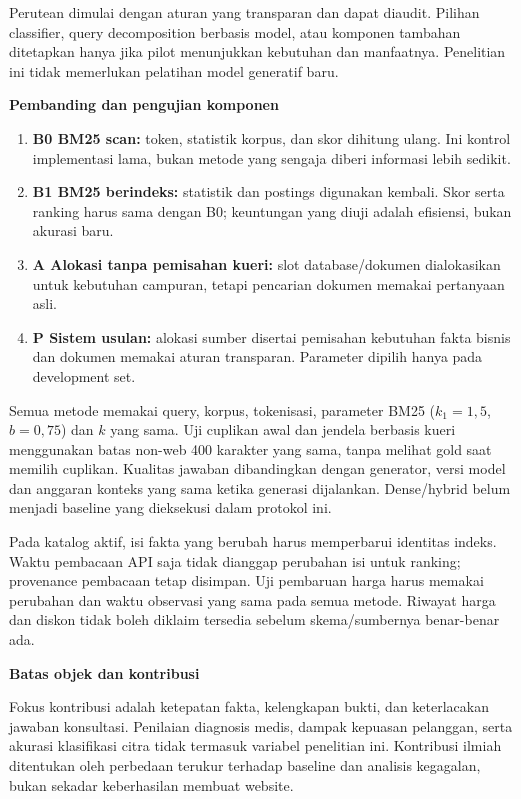 \documentclass[11pt,a4paper]{article}
\newcommand{\subheading}[1]{\vspace{3pt}\textbf{#1}\par}
\begin{document}
Perutean dimulai dengan aturan yang transparan dan dapat diaudit. Pilihan classifier, query decomposition berbasis model, atau komponen tambahan ditetapkan hanya jika pilot menunjukkan kebutuhan dan manfaatnya. Penelitian ini tidak memerlukan pelatihan model generatif baru.

\subheading{Pembanding dan pengujian komponen}
\begin{enumerate}
\item \textbf{B0 BM25 scan:} token, statistik korpus, dan skor dihitung ulang. Ini kontrol implementasi lama, bukan metode yang sengaja diberi informasi lebih sedikit.
\item \textbf{B1 BM25 berindeks:} statistik dan postings digunakan kembali. Skor serta ranking harus sama dengan B0; keuntungan yang diuji adalah efisiensi, bukan akurasi baru.
\item \textbf{A Alokasi tanpa pemisahan kueri:} slot database/dokumen dialokasikan untuk kebutuhan campuran, tetapi pencarian dokumen memakai pertanyaan asli.
\item \textbf{P Sistem usulan:} alokasi sumber disertai pemisahan kebutuhan fakta bisnis dan dokumen memakai aturan transparan. Parameter dipilih hanya pada development set.
\end{enumerate}

Semua metode memakai query, korpus, tokenisasi, parameter BM25 ($k_1=1{,}5$, $b=0{,}75$) dan $k$ yang sama. Uji cuplikan awal dan jendela berbasis kueri menggunakan batas non-web 400 karakter yang sama, tanpa melihat gold saat memilih cuplikan. Kualitas jawaban dibandingkan dengan generator, versi model dan anggaran konteks yang sama ketika generasi dijalankan. Dense/hybrid belum menjadi baseline yang dieksekusi dalam protokol ini.

Pada katalog aktif, isi fakta yang berubah harus memperbarui identitas indeks. Waktu pembacaan API saja tidak dianggap perubahan isi untuk ranking; provenance pembacaan tetap disimpan. Uji pembaruan harga harus memakai perubahan dan waktu observasi yang sama pada semua metode. Riwayat harga dan diskon tidak boleh diklaim tersedia sebelum skema/sumbernya benar-benar ada.

\subheading{Batas objek dan kontribusi}
Fokus kontribusi adalah ketepatan fakta, kelengkapan bukti, dan keterlacakan jawaban konsultasi. Penilaian diagnosis medis, dampak kepuasan pelanggan, serta akurasi klasifikasi citra tidak termasuk variabel penelitian ini. Kontribusi ilmiah ditentukan oleh perbedaan terukur terhadap baseline dan analisis kegagalan, bukan sekadar keberhasilan membuat website.
\end{document}

